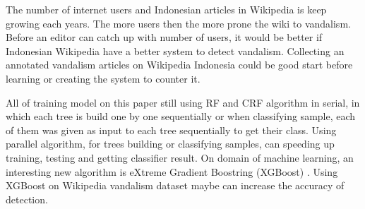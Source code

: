 \documentclass[conference,compsoc,a4paper,twocolumn,final]{IEEEtran}
\begin{document}
The number of internet users and Indonesian articles in Wikipedia is keep
growing each years.
The more users then the more prone the wiki to vandalism.
Before an editor can catch up with number of users, it would be better if
Indonesian Wikipedia have a better system to detect vandalism.
Collecting an annotated vandalism articles on Wikipedia Indonesia could be
good start before learning or creating the system to counter it.

All of training model on this paper still using RF and CRF algorithm in serial,
in which each tree is build one by one sequentially or when classifying sample,
each of them was given as input to each tree sequentially to get their class.
Using parallel algorithm, for trees building or classifying samples, can
speeding up training, testing and getting classifier result.
On domain of machine learning, an interesting new algorithm is eXtreme
Gradient Boostring (XGBoost)
\cite{chen2016xgboost}.
Using XGBoost on Wikipedia vandalism dataset maybe can increase the accuracy
of detection.




\end{document}
